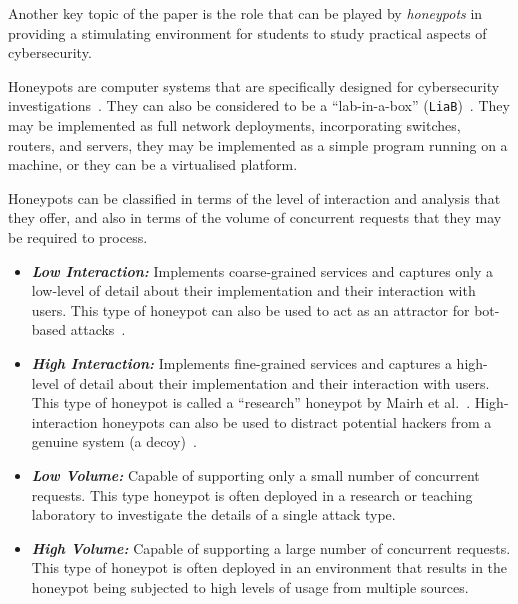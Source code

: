 \documentclass[10pt,journal]{IEEEtran}
\begin{document}
Another key topic of the paper is the role that can be played by \emph{honeypots}
in providing a stimulating environment for students to study practical
aspects of cybersecurity.

Honeypots are computer systems that are specifically designed for
cybersecurity investigations~\cite{FKAS:17,BCF:12}. They can also be considered to be a ``lab-in-a-box'' (\texttt{LiaB})~\cite{CFDMH:09}. They may be
implemented as full network deployments, incorporating switches, routers, and
servers, they may be implemented as a simple program running on a machine, or they can be a virtualised platform. 

Honeypots can be classified in terms of the level of interaction and
analysis that they offer, and also in terms of the volume of concurrent requests
that they may be required to process.

\begin{itemize}

  \item \noindent \emph{\textbf{Low Interaction:}} Implements coarse-grained
    services and captures only a low-level of detail about their implementation
    and their interaction with users.  This type of honeypot can also be used
    to act as an attractor for bot-based attacks~\cite{SZB:16}.  

  \item \noindent \emph{\textbf{High Interaction:}} Implements fine-grained
    services and captures a high-level of detail about their implementation and
    their interaction with users.  This type of honeypot is called a
    ``research'' honeypot by Mairh et al.~\cite{MBVJ:11}. High-interaction
    honeypots can also be used to distract potential hackers from a genuine
    system (a decoy)~\cite{M:06,SNKA:12}.

\end{itemize}


\begin{itemize}

  \item \noindent \emph{\textbf{Low Volume:}} Capable of supporting only a
    small number of concurrent requests.  This type honeypot is often deployed
    in a research or teaching laboratory to investigate the details of a single
    attack type.

  \item \noindent \emph{\textbf{High Volume:}} Capable of supporting a large
    number of concurrent requests. This type of honeypot is often deployed in
    an environment that results in the honeypot being subjected to high levels
    of usage from multiple sources. 

\end{itemize}
\end{document}
